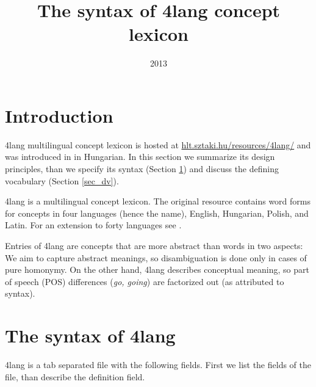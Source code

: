 \documentclass[a4paper,10pt]{article}
\title{The syntax of 4lang concept lexicon}
\date{2013}
\begin{document}
\maketitle
\section*{Introduction}
4lang multilingual concept lexicon is hosted at \url{hlt.sztaki.hu/resources/4lang/} and was introduced in \cite{Kornai:2013} in Hungarian. In this section we summarize its design principles, than we specify its syntax (Section \ref{sec_synt}) and discuss the defining vocabulary (Section \ref{sec_dv}).

4lang is a multilingual concept lexicon. The original resource contains word forms for concepts in four languages (hence the name), English, Hungarian, Polish, and Latin. For an extension to forty languages see \cite{Acs:2013}.

Entries of 4lang are concepts that are more abstract than words in two aspects: We aim to capture abstract meanings, so disambiguation is done only in cases of pure homonymy. On the other hand, 4lang describes conceptual meaning, so part of speech (POS) differences (\emph{go, going}) are factorized out (as attributed to syntax).
\section{The syntax of 4lang}\label{sec_synt}
4lang is a tab separated file with the following fields. First we list the fields of the file, than describe the definition field.
\end{document}
